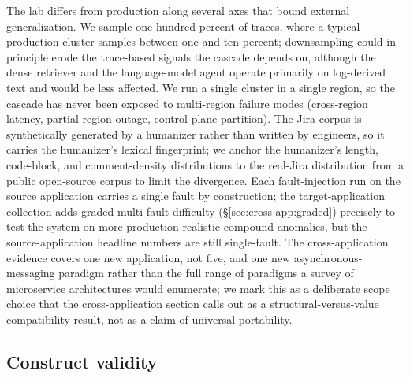 The lab differs from production along several axes that bound external generalization. We sample one hundred percent of traces, where a typical production cluster samples between one and ten percent; downsampling could in principle erode the trace-based signals the cascade depends on, although the dense retriever and the language-model agent operate primarily on log-derived text and would be less affected. We run a single cluster in a single region, so the cascade has never been exposed to multi-region failure modes (cross-region latency, partial-region outage, control-plane partition). The Jira corpus is synthetically generated by a humanizer rather than written by engineers, so it carries the humanizer's lexical fingerprint; we anchor the humanizer's length, code-block, and comment-density distributions to the real-Jira distribution from a public open-source corpus to limit the divergence. Each fault-injection run on the source application carries a single fault by construction; the target-application collection adds graded multi-fault difficulty (\S\ref{sec:cross-app:graded}) precisely to test the system on more production-realistic compound anomalies, but the source-application headline numbers are still single-fault. The cross-application evidence covers one new application, not five, and one new asynchronous-messaging paradigm rather than the full range of paradigms a survey of microservice architectures would enumerate; we mark this as a deliberate scope choice that the cross-application section calls out as a structural-versus-value compatibility result, not as a claim of universal portability.

\subsection{Construct validity}
\label{sec:threats:construct}


